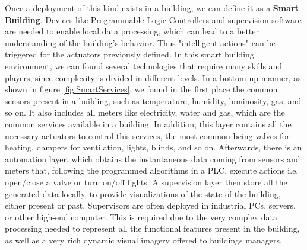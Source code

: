 Once a deployment of this kind exists in a building, we can define it as a \textbf{Smart Building}.
Devices like Programmable Logic Controllers\todo{\cite{}} and supervision software\todo{\cite{}} are needed to enable local data processing, which can lead to a better understanding of the building's behavior. Thus "intelligent actions" can be triggered for the actuators previously defined.
In this smart building environment, we can found several technologies that require many skills and players, since complexity is divided in different levels.
In a bottom-up manner, as shown in figure \ref{fig:SmartServices}, we found in the first place the common sensors present in a building, such as temperature, humidity, luminosity, gas, and so on. 
It also includes all meters like electricity, water and gas, which are the common services available in a building.
In addition, this layer contains all the necessary actuators to control this services, the most common being valves for heating, dampers for ventilation, lights, blinds, and so on.
Afterwards, there is an automation layer, which obtains the instantaneous data coming from sensors and meters that, following the programmed algorithms in a PLC, execute actions i.e. open/close a valve or turn on/off lights.
A supervision layer then store all the generated data locally, to provide visualizations of the state of the building, either present or past.
Supervisors are often deployed in industrial PCs, servers, or other high-end computer.
This is required due to the very complex data processing needed to represent all the functional features present in the building, as well as a very rich dynamic visual imagery offered to buildings managers.

